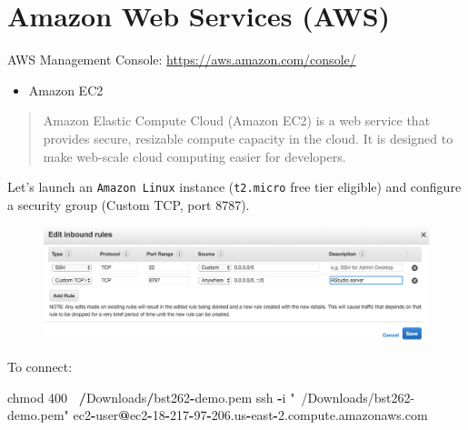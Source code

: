 \documentclass[]{book}
\newenvironment{Shaded}{\begin{snugshade}}{\end{snugshade}}
\newcommand{\DecValTok}[1]{\textcolor[rgb]{0.00,0.00,0.81}{#1}}
\newcommand{\FloatTok}[1]{\textcolor[rgb]{0.00,0.00,0.81}{#1}}
\newcommand{\StringTok}[1]{\textcolor[rgb]{0.31,0.60,0.02}{#1}}
\newcommand{\OperatorTok}[1]{\textcolor[rgb]{0.81,0.36,0.00}{\textbf{#1}}}
\newcommand{\ErrorTok}[1]{\textcolor[rgb]{0.64,0.00,0.00}{\textbf{#1}}}
\newcommand{\NormalTok}[1]{#1}
\providecommand{\tightlist}{%
  \setlength{\itemsep}{0pt}\setlength{\parskip}{0pt}}
\theoremstyle{definition}
\theoremstyle{definition}
\theoremstyle{definition}
\theoremstyle{remark}
\begin{document}
\section{Amazon Web Services (AWS)}\label{amazon-web-services-aws}

AWS Management Console: \url{https://aws.amazon.com/console/}

\begin{itemize}
\tightlist
\item
  Amazon EC2
\end{itemize}

\begin{quote}
Amazon Elastic Compute Cloud (Amazon EC2) is a web service that provides
secure, resizable compute capacity in the cloud. It is designed to make
web-scale cloud computing easier for developers.
\end{quote}

Let's launch an \texttt{Amazon\ Linux} instance (\texttt{t2.micro} free
tier eligible) and configure a security group (Custom TCP, port 8787).

\begin{figure}

{\centering \includegraphics[width=30.36in]{images/ch6_aws_security_groups} 

}

\end{figure}

To connect:

\begin{Shaded}
\begin{Highlighting}[]
\NormalTok{chmod }\DecValTok{400} \OperatorTok{~}\ErrorTok{/}\NormalTok{Downloads}\OperatorTok{/}\NormalTok{bst262}\OperatorTok{-}\NormalTok{demo.pem}
\NormalTok{ssh }\OperatorTok{-}\NormalTok{i }\StringTok{"~/Downloads/bst262-demo.pem"}\NormalTok{ ec2}\OperatorTok{-}\NormalTok{user}\OperatorTok{@}\NormalTok{ec2}\OperatorTok{-}\DecValTok{18}\OperatorTok{-}\DecValTok{217}\OperatorTok{-}\DecValTok{97}\OperatorTok{-}\FloatTok{206.}\NormalTok{us}\OperatorTok{-}\NormalTok{east}\OperatorTok{-}\FloatTok{2.}\NormalTok{compute.amazonaws.com}
\end{Highlighting}
\end{Shaded}
\end{document}
